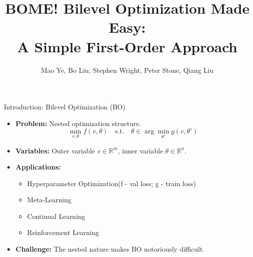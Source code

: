 \documentclass{beamer}
\title[BOME: Bilevel Optimization Made Easy]{BOME! Bilevel Optimization Made Easy:\\ A Simple First-Order Approach}
\author[Mao Ye et al.]{Mao Ye, Bo Liu, Stephen Wright, Peter Stone, Qiang Liu}
\date{\footnotesize
\par\bigskip\small Presented by: Papay Ivan
}
\begin{document}
\begin{frame}
\thispagestyle{empty}
\maketitle
\end{frame}

\begin{frame}{Introduction: Bilevel Optimization (BO)}
    \begin{itemize}
        \item \textbf{Problem:} Nested optimization structure.
        \begin{equation*}
            \min_{v,\theta} f(v,\theta) \quad \text{s.t.} \quad \theta \in \arg \min_{\theta'} g(v,\theta')
        \end{equation*}
        \item \textbf{Variables:} Outer variable $v \in \mathbb{R}^m$, inner variable $\theta \in \mathbb{R}^n$.
        \item \textbf{Applications:}
            \begin{itemize}
                \item Hyperparameter Optimization(f - val loss; g - train loss)
                \item Meta-Learning
                \item Continual Learning
                \item Reinforcement Learning
            \end{itemize}
        \item \textbf{Challenge:} The nested nature makes BO notoriously difficult.
    \end{itemize}
\end{frame}
\end{document}
